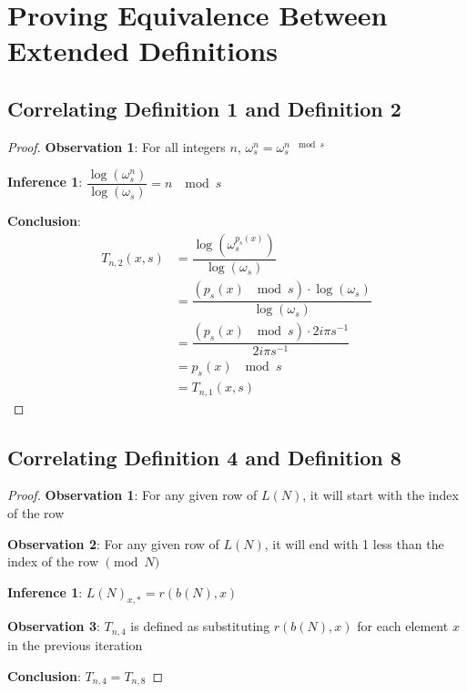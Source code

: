 \documentclass[conference]{IEEEtran}
\begin{document}
\section{Proving Equivalence Between Extended Definitions}

\subsection{Correlating Definition 1 and Definition 2}

\begin{proof}
\par\noindent\par
    \textbf{Observation 1}: For all integers $n$, $\omega_s^n = \omega_s^{n \; \mod{s}}$

    \textbf{Inference 1}: $\dfrac{\log(\omega_s^n)}{\log(\omega_s)} = n \; \mod{s}$

    \textbf{Conclusion}: \begin{equation}
        \begin{aligned}
            T_{n,2}(x, s) &= \dfrac{\log(\omega_s^{p_s(x)})}{\log(\omega_s)} \\
                          &= \dfrac{(p_s(x) \; \mod{s}) \cdot \log(\omega_s)}{\log(\omega_s)} \\
                          &= \dfrac{(p_s(x) \; \mod{s}) \cdot 2i\pi s^{-1}}{2i\pi s^{-1}} \\
                          &= p_s(x) \; \mod{s} \\
                          &= T_{n,1}(x, s)
        \end{aligned}
    \end{equation}
\end{proof}

\subsection{Correlating Definition 4 and Definition 8}

\begin{proof}
\par\noindent\par
    \textbf{Observation 1}: For any given row of $L(N)$, it will start with the index of the row

    \textbf{Observation 2}: For any given row of $L(N)$, it will end with 1 less than the index of the row $\pmod{N}$

    \textbf{Inference 1}: $L(N)_{x,*} = r(b(N), x)$

    \textbf{Observation 3}: $T_{n,4}$ is defined as substituting $r(b(N),x)$ for each element $x$ in the previous iteration

    \textbf{Conclusion}: $T_{n,4} = T_{n,8}$
\end{proof}
\end{document}
